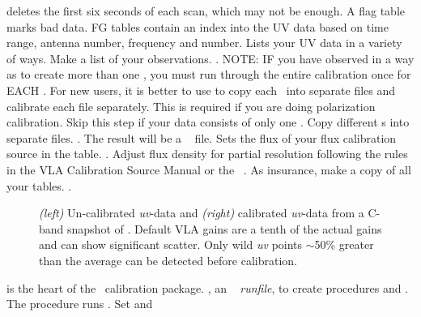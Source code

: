 deletes the first six seconds of each scan, which may not be enough.
\tablestyle
\beddes
{} A flag table marks bad data. FG tables contain an index
into the UV data based on time range, antenna number, frequency and
\IF number.
\eeddes
\normalstyle
{} Lists your UV data in a variety of ways.  Make a list
of your observations.
.
NOTE: IF you have observed in a way as to create more than one
\freqid,  you must run through the entire calibration once for EACH
\freqid\@.  For new users, it is better to use  to copy
each \freqid\ into separate files and calibrate each file separately.
This is required if you are doing polarization calibration.
 Skip this step if your data consists of only one
\freqid\@. Copy different \freqid s into separate files.
.
The result will be a ~ file.
 Sets the flux of your flux calibration source in
the \SU table.
.
Adjust flux density for partial resolution following the rules in the
VLA Calibration Source Manual or the \AIPS\ \COOKBOOK.
 As insurance, make a copy of all your tables.
.
\begin{figure}[t]
\centering
\caption[Visibility data before and after calibration]{{\it (left)}
Un-calibrated {\it uv}-data and  {\it (right)} calibrated {\it
uv}-data from a C-band snapshot of \TCTES.  Default VLA gains are a
tenth of the actual gains and can show significant scatter.  Only wild
{\it uv} points $\sim$50\% greater than the average can be detected
before calibration.}
\end{figure}
  is the heart of the \AIPS\
   calibration package.  , an \AIPS\ {\it
   runfile}, to create procedures  and .  The procedure
    runs .  Set  and
